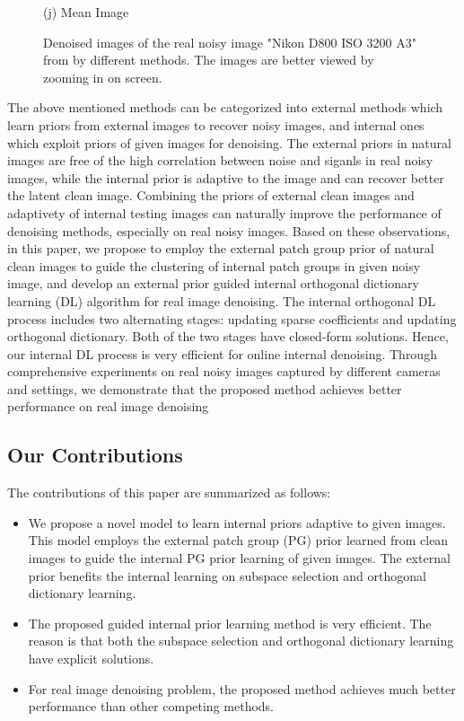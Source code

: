 \documentclass[10pt,twocolumn,letterpaper]{article}
\begin{document}
\begin{figure}
{\begin{minipage}[t]{0.195\textwidth}
{\footnotesize (j) Mean Image \cite{crosschannel2016} }
\end{minipage}
}\vspace{-1mm}
\caption{Denoised images of the real noisy image "Nikon D800 ISO 3200 A3" from \cite{crosschannel2016} by different methods. The images are better viewed by zooming in on screen.} 
\vspace{-4mm}
\label{fig1}
\end{figure}

The above mentioned methods can be categorized into external methods which learn priors from external images to recover noisy images, and internal ones which exploit priors of given images for denoising. The external priors in natural images are free of the high correlation between noise and siganls in real noisy images, while the internal prior is adaptive to the image and can recover better the latent clean image. Combining the priors of external clean images and adaptivety of internal testing images can naturally improve the performance of denoising methods, especially on real noisy images. Based on these observations, in this paper, we propose to employ the external patch group prior \cite{pgpd} of natural clean images to guide the clustering of internal patch groups in given noisy image, and develop an external prior guided internal orthogonal dictionary learning (DL) algorithm for real image denoising. The internal orthogonal DL process includes two alternating stages: updating sparse coefficients and updating orthogonal dictionary. Both of the two stages have closed-form solutions. Hence, our internal DL process is very efficient for online internal denoising. Through comprehensive experiments on real noisy images captured by different cameras and settings, we demonstrate that the proposed method achieves better performance on real image denoising

\subsection{Our Contributions}

The contributions of this paper are summarized as follows:
\begin{itemize}
\item We propose a novel model to learn internal priors adaptive to given images. This model employs the external patch group (PG) prior learned from clean images to guide the internal PG prior learning of given images. The external prior benefits the internal learning on subspace selection and orthogonal dictionary learning.
\item The proposed guided internal prior learning method is very efficient. The reason is that both the subspace selection and orthogonal dictionary learning have explicit solutions.
\item For real image denoising problem, the proposed method achieves much better performance than other competing methods.
\end{itemize}
\end{document}
